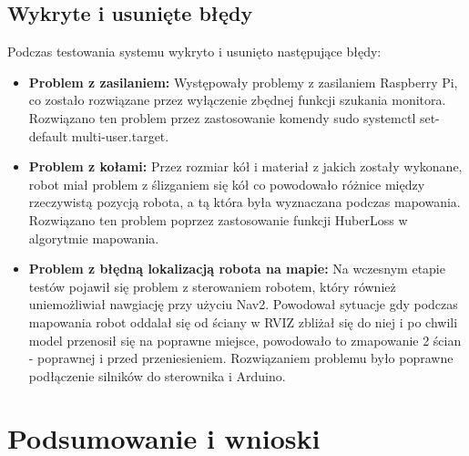 \documentclass[a4paper,twoside,12pt]{book}
\begin{document}
\section{Wykryte i usunięte błędy}
Podczas testowania systemu wykryto i usunięto następujące błędy:
\begin{itemize}
	\item \textbf{Problem z zasilaniem:} Występowały problemy z zasilaniem Raspberry Pi, co zostało rozwiązane przez wyłączenie zbędnej funkcji szukania monitora. Rozwiązano ten problem przez zastosowanie komendy sudo systemctl set-default multi-user.target.
	\item \textbf{Problem z kołami:} Przez rozmiar kół i materiał z jakich zostały wykonane, robot miał problem z ślizganiem się kół co powodowało różnice między rzeczywistą pozycją robota, a tą która była wyznaczana podczas mapowania. Rozwiązano ten problem poprzez zastosowanie funkcji HuberLoss w algorytmie mapowania.
	\item \textbf{Problem z błędną lokalizacją robota na mapie:} Na wczesnym etapie testów pojawił się problem z sterowaniem robotem, który również uniemożliwiał nawgiację przy użyciu Nav2. Powodował sytuacje gdy podczas mapowania robot oddalał się od ściany w RVIZ zbliżał się do niej i po chwili model przenosił się na poprawne miejsce, powodowało to zmapowanie 2 ścian - poprawnej i przed przeniesieniem. Rozwiązaniem problemu było poprawne podłączenie silników do sterownika i Arduino.
\end{itemize}






\chapter{Podsumowanie i wnioski}
\end{document}
